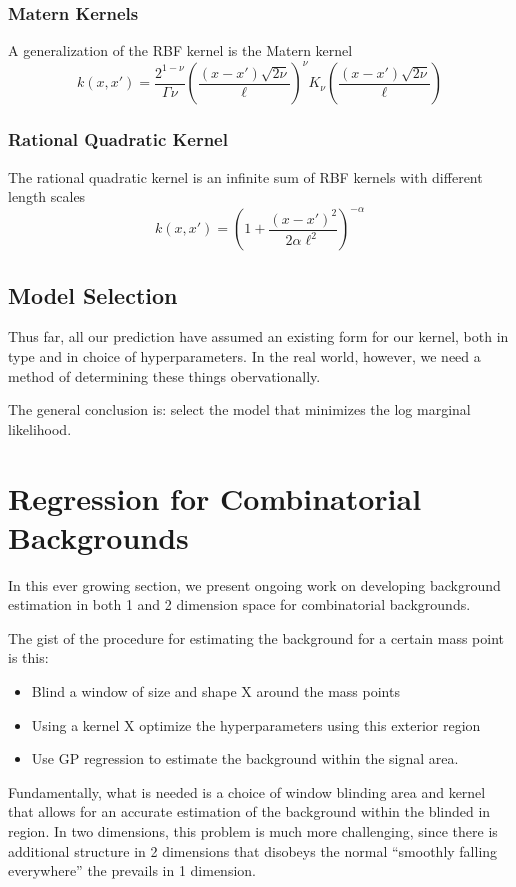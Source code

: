 \documentclass[10pt]{article}
\theoremstyle{definition}
\begin{document}
\subsubsection{Matern Kernels}

A generalization of the RBF kernel is the Matern kernel
\begin{equation}
  k(x,x') = \frac{2^{1-\nu}}{\Gamma{\nu}} \left( \frac{(x-x')\sqrt{2\nu}}{\ell} \right)^{\nu} K_{\nu}\left(  \frac{(x-x')\sqrt{2\nu}}{\ell} \right)
\end{equation}

\subsubsection{Rational Quadratic Kernel}
The rational quadratic kernel is an infinite sum of RBF kernels with different length scales
\begin{equation}
  k(x,x') = \left( 1 + \frac{ \left( x -x' \right)^2 }{2 \alpha \ell^2} \right)^{-\alpha}
\end{equation}

\subsection{Model Selection}
Thus far, all our prediction have assumed an existing form for our kernel, both in type and in choice of hyperparameters.
In the real world, however, we need a method of determining these things obervationally.

The general conclusion is: select the model that minimizes the log marginal likelihood. 

\section{Regression for Combinatorial Backgrounds}
\label{sec:regression-for-qcd}

In this ever growing section, we present ongoing work on developing background estimation in both 1 and 2 dimension space for combinatorial backgrounds.

The gist of the procedure for estimating the background for a certain mass point is this:
\begin{itemize}
\item Blind a window of size and shape X around the mass points
\item Using a kernel X optimize the hyperparameters using this exterior region
\item Use GP regression to estimate the background within the signal area. 
\end{itemize}
Fundamentally, what is needed is a choice of window blinding area and kernel that allows for an accurate estimation of the background within the blinded in region.
In two dimensions, this problem is much more challenging, since there is additional structure in 2 dimensions that disobeys the normal ``smoothly falling everywhere'' the prevails in 1 dimension. 
\end{document}
